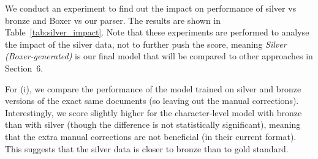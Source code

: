 \documentclass[11pt,a4paper]{article}
\begin{document}
We conduct an experiment to find out the impact on performance of silver vs bronze and Boxer vs our parser. The results are shown in Table~\ref{tab:silver_impact}. 
Note that these experiments are performed to analyse the impact of the silver data, not to further push the score, meaning \emph{Silver (Boxer-generated)} is our final model that will be compared to other approaches in Section~6.

\begin{table}[!t]
\centering
\setlength{\tabcolsep}{3pt}
\caption{Test set results of the experiments that analyse the impact of the silver data.}
\label{tab:silver_impact}
\end{table}

For (i), we compare the performance of the model trained on silver and bronze versions of the exact same documents (so leaving out the manual corrections). Interestingly, we score slightly higher for the character-level model with bronze than with silver (though the difference is not statistically significant), meaning that the extra manual corrections are not beneficial (in their current format). This suggests that the silver data is closer to bronze than to gold standard.
\end{document}
